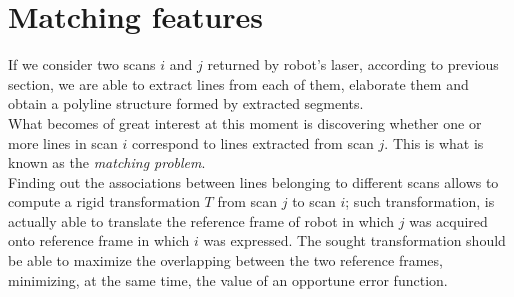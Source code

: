 \documentclass[a4paper, onecolumn]{report}
\begin{document}
\section{Matching features}
If we consider two scans $i$ and $j$ returned by robot's laser, according to previous section, we are able to extract lines from each of them, elaborate them and obtain a polyline structure formed by extracted segments. \\
What becomes of great interest at this moment is discovering whether one or more lines in scan $i$ correspond to lines extracted from scan $j$. This is what is known as the \emph{matching problem}. \\
Finding out the associations between lines belonging to different scans allows to compute a rigid transformation $T$ from scan $j$ to scan $i$; such transformation, is actually able to translate the reference frame of robot in which $j$ was acquired onto reference frame in which $i$ was expressed. The sought transformation should be able to maximize the overlapping between the two reference frames, minimizing, at the same time, the value of an opportune error function.
\end{document}
